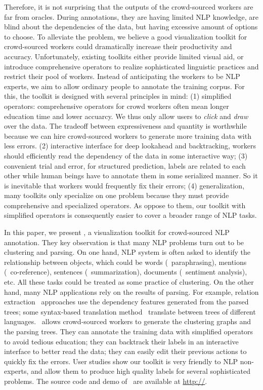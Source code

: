 Therefore, it is not surprising that the outputs of the crowd-sourced workers are far from oracles. During annotations, they are having limited NLP knowledge, are blind about the dependencies of the data, but having excessive amount of options to choose. To alleviate the problem, we believe a good visualization toolkit for crowd-sourced workers could dramatically increase their productivity and accuracy. Unfortunately, existing toolkits either provide limited visual aid, or introduce comprehensive operators to realize sophisticated linguistic practices and restrict their pool of workers. Instead of anticipating the workers to be NLP experts, we aim to allow ordinary people to annotate the training corpus. For this, the toolkit is designed with several principles in mind: (1) simplified operators: comprehensive operators for crowd workers often mean longer education time and lower accuarcy. We thus only allow users to {\em click} and {\em draw} over the data. The tradeoff between expressiveness and quantity is worthwhile because we can hire crowd-sourced workers to generate more training data with less errors. (2) interactive interface for deep lookahead and backtracking, workers should efficiently read the dependency of the data in some interactive way; (3) convenient trial and error, for structured prediction, labels are related to each other while human beings have to annotate them in some serialized manner. So it is inevitable that workers would frequently fix their errors; (4) generalization, many toolkits only specialize on one problem because they must provide comprehensive and specialized operators. As oppose to them, our toolkit with simplified operators is consequently easier to cover a broader range of NLP tasks.

In this paper, we present \sys, a visualization toolkit for crowd-sourced NLP annotation. They key observation is that many NLP problems turn out to be clustering and parsing. On one hand, NLP system is often asked to identify the relationship between objects, which could be words (\eg\ paraphrasing), mentions (\eg\ co-reference), sentences (\eg\ summarization), documents (\eg\ sentiment analysis), etc. All these tasks could be treated as some practice of clustering. On the other hand, many NLP applications rely on the results of parsing. For example, relation extraction~\cite{hoffmann2011knowledge} approaches use the dependency features generated from the parsed trees; some syntax-based translation method~\cite{chiang2010learning} translate between trees of different languages. \sys\ allows crowd-sourced workers to generate the clustering graphs and the parsing trees. They can annotate the training data with simplified operators to avoid tedious education; they can backtrack their labels in an interactive interface to better read the data; they can easily edit their previous actions to quickly fix the errors. User studies show our toolkit is very friendly to NLP non-experts, and allow them to produce high quality labels for several sophisticated problems.  The source code and demo of \sys\ are available at \url{http://}.

